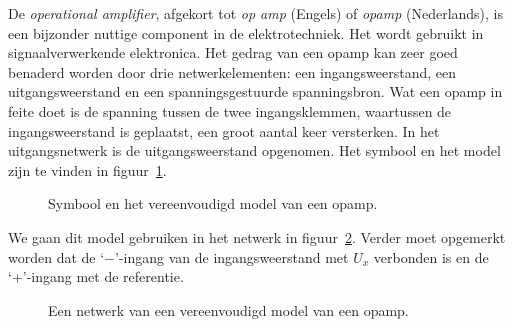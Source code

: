 \begin{example}
De \textsl{operational amplifier}, afgekort tot \textsl{op amp} (Engels) of \textsl{opamp} (Nederlands), is een bijzonder nuttige component in de elektrotechniek. Het wordt gebruikt in signaalverwerkende elektronica. Het gedrag van een opamp kan zeer goed benaderd worden door drie netwerkelementen: een ingangsweerstand, een uitgangsweerstand en een spanningsgestuurde spanningsbron. Wat een opamp in feite doet is de spanning tussen de twee ingangsklemmen, waartussen de ingangsweerstand is geplaatst, een groot aantal keer versterken. In het uitgangsnetwerk is de uitgangsweerstand opgenomen. Het symbool en het model zijn te vinden in figuur~\ref{fig:gelmodelopamp}.

\begin{figure}[H]
\centering
{}
\caption{Symbool en het vereenvoudigd model van een opamp.}
\label{fig:gelmodelopamp}
\end{figure}

We gaan dit model gebruiken in het netwerk in figuur~\ref{fig:gelmodelopampinverter}. Verder moet opgemerkt worden dat de `$-$'-ingang van de ingangsweerstand met $U_x$ verbonden is en de `+'-ingang met de referentie.

\begin{figure}[H]
\centering
{}
\caption{Een netwerk van een vereenvoudigd model van een opamp.}
\label{fig:gelmodelopampinverter}
\end{figure}


\end{example}
